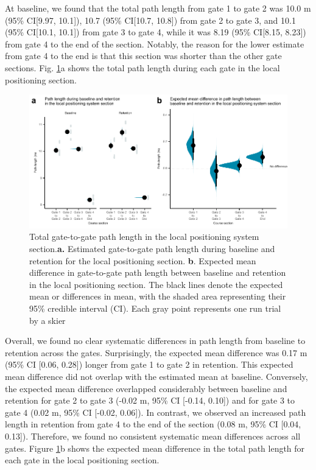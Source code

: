 \documentclass{article}
\begin{document}

At baseline, we found that the total path length from gate 1 to gate 2 was 10.0 m (95\% CI[9.97,  10.1]), 10.7 (95\% CI[10.7, 10.8]) from gate 2 to gate 3, and 10.1 (95\% CI[10.1, 10.1]) from gate 3 to gate 4, while it was 8.19 (95\% CI[8.15, 8.23]) from gate 4 to the end of the section. Notably, the reason for the lower estimate from gate 4 to the end is that this section was shorter than the other gate sections. Fig. \ref{fig: path}a shows the total path length during each gate in the local positioning section.


\begin{figure}[H]
    \centering
    \includegraphics[width=1\linewidth]{figurer/figure_path2.pdf}
    \caption{Total gate-to-gate path length in the local positioning system section.\textbf{a.} Estimated gate-to-gate path length during baseline and retention for the local positioning section. \textbf{b}. Expected mean difference in gate-to-gate path length between baseline and retention in the local positioning section. The black lines denote the expected mean or differences in mean, with the shaded area representing their 95\% credible interval (CI). Each gray point represents one run trial by a skier}
    \label{fig: path}
\end{figure}

Overall, we found no clear systematic differences in path length from baseline to retention across the gates. Surprisingly, the expected mean difference was 0.17 m (95\% CI [0.06, 0.28]) longer from gate 1 to gate 2 in retention. This expected mean difference did not overlap with the estimated mean at baseline. Conversely, the expected mean difference overlapped considerably between baseline and retention for gate 2 to gate 3 (-0.02 m, 95\% CI [-0.14, 0.10]) and for gate 3 to gate 4 (0.02 m, 95\% CI [-0.02, 0.06]). In contrast, we observed an increased path length in retention from gate 4 to the end of the section (0.08 m, 95\% CI [0.04, 0.13]). Therefore, we found no consistent systematic mean differences across all gates. Figure \ref{fig: path}b shows the expected mean difference in the total path length for each gate in the local positioning section. 
\end{document}
